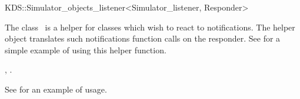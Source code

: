 

\begin{ccRefClass}{KDS::Simulator_objects_listener<Simulator_listener, Responder>}  %


\ccDefinition
  
The class \ccRefName\ is a helper for classes which wish to react to
 notifications. The helper
object translates such notifications  function calls
on the responder. See  for a
simple example of using this helper function.



\ccCreation
{}  %


\ccSeeAlso

,
.

\ccExample

See  for an example of usage.

\end{ccRefClass}


